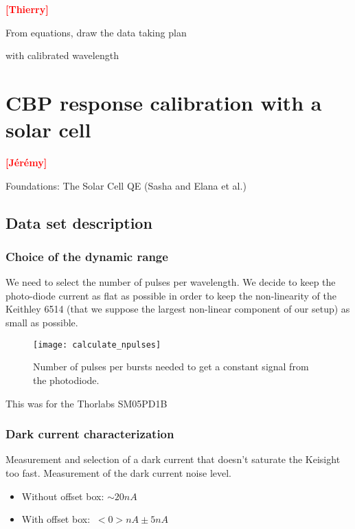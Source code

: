 \documentclass[onecolumn]{aa}
\newcommand{\Oldthorlabs}{SM05PD1B}
\newcommand{\todo}[1]{\textbf{\textcolor{red}{[#1]}}\xspace}
\begin{document}
\todo{Thierry}

From equations, draw the data taking plan

with calibrated wavelength

\section{CBP response calibration with a solar cell}

\todo{Jérémy}

Foundations: The Solar Cell QE (Sasha and Elana et al.)


\subsection{Data set description}


\subsubsection{Choice of the dynamic range}
We need to select the number of pulses per wavelength. We decide to keep the
photo-diode current as flat as possible in order to keep the non-linearity of
the Keithley 6514 (that we suppose the largest non-linear component of our
setup) as small as possible.


\begin{figure}[!ht]
\begin{center}
\texttt{[image: calculate\_npulses]}
\end{center}
\caption[]{Number of pulses per bursts needed to get a constant signal from the photodiode.}
\label{fig:calculate_npulses}
\end{figure}

This was for the Thorlabs \Oldthorlabs


\subsubsection{Dark current characterization}

Measurement and selection of a dark current that doesn't saturate the Keisight
too fast. Measurement of the dark current noise level. 

\begin{itemize}
\item Without offset box: $\sim 20 nA$
\item With offset box: $~ <0> nA \pm 5 nA$
\end{itemize}
\end{document}
